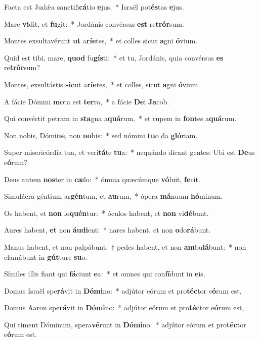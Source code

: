 \item Facta est Judǽa sanctifi\textbf{cá}tio \textbf{e}jus,~* Israël pot\textbf{és}tas \textbf{e}jus.
\item Mare \textbf{vi}dit, et \textbf{fu}git:~* Jordánis convérsus \textbf{est} re\textbf{trór}sum.
\item Montes exsultavérunt \textbf{ut} a\textbf{rí}\textbf{e}tes,~* et colles sicut \textbf{a}gni \textbf{ó}vium.
\item Quid est tibi, mare, \textbf{quod} fu\textbf{gís}ti:~* et tu, Jordánis, quia convérsus \textbf{es} re\textbf{trór}sum?
\item Montes, exsultástis \textbf{sic}ut a\textbf{rí}\textbf{e}tes,~* et colles, sicut \textbf{a}gni \textbf{ó}vium.
\item A fácie Dómini \textbf{mo}ta est \textbf{ter}ra,~* a fácie \textbf{De}i \textbf{Ja}cob.
\item Qui convértit petram in \textbf{sta}gna a\textbf{quá}rum,~* et rupem in \textbf{fon}tes a\textbf{quá}rum.
\item Non nobis, Dómi\textbf{ne}, non \textbf{no}bis:~* sed nómini \textbf{tu}o da \textbf{gló}riam.
\item Super misericórdia tua, et veri\textbf{tá}te \textbf{tu}a:~* nequándo dicant gentes: Ubi est \textbf{De}us e\textbf{ó}rum?
\item Deus autem \textbf{nos}ter in \textbf{cæ}lo:~* ómnia quæcúmque \textbf{vó}luit, \textbf{fe}cit.
\item Simulácra géntium ar\textbf{gén}tum, et \textbf{au}rum,~* ópera \textbf{má}nuum \textbf{hó}minum.
\item Os habent, et \textbf{non} lo\textbf{quén}tur:~* óculos habent, et \textbf{non} vi\textbf{dé}bunt.
\item Aures habent, \textbf{et} non \textbf{áu}\textbf{di}ent:~* nares habent, et non \textbf{o}do\textbf{rá}bunt.
\item Manus habent, et non palpábunt:~† pedes habent, et non \textbf{am}bu\textbf{lá}bunt:~* non clamábunt in \textbf{gút}ture \textbf{su}o.
\item Símiles illis fiant qui \textbf{fá}ciunt \textbf{e}a:~* et omnes qui con\textbf{fí}dunt in \textbf{e}is.
\item Domus Israël spe\textbf{rá}vit in \textbf{Dó}\textbf{mi}no:~* adjútor eórum et pro\textbf{téc}tor e\textbf{ó}rum est,
\item Domus Aaron spe\textbf{rá}vit in \textbf{Dó}\textbf{mi}no:~* adjútor eórum et pro\textbf{téc}tor e\textbf{ó}rum est,
\item Qui timent Dóminum, spera\textbf{vé}runt in \textbf{Dó}\textbf{mi}no:~* adjútor eórum et pro\textbf{téc}tor e\textbf{ó}rum est.
